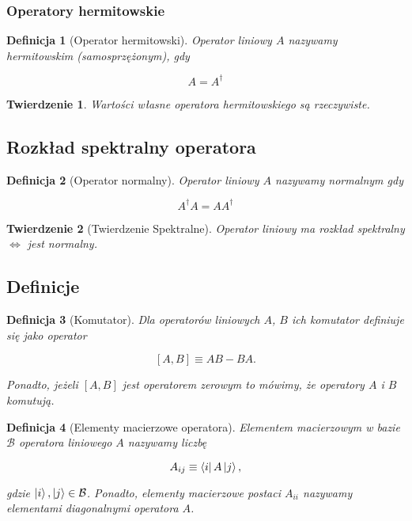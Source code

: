 \documentclass[a4paper,12pt]{article}
\newtheorem{definition}{Definicja}
\newtheorem{theorem}{Twierdzenie}
\begin{document}
\subsubsection{Operatory hermitowskie}

\begin{definition}[Operator hermitowski]
    Operator liniowy $A$ nazywamy hermitowskim (samosprzężonym), gdy

    $$
        A = A ^ {\dag}
    $$
\end{definition}

\begin{theorem}
    Wartości własne operatora hermitowskiego są rzeczywiste.
\end{theorem}

\subsection{Rozkład spektralny operatora}

\begin{definition}[Operator normalny]
    Operator liniowy $A$ nazywamy normalnym gdy

    $$
        A ^ {\dag} A = A A ^ {\dag}
    $$
\end{definition}

\begin{theorem}[Twierdzenie Spektralne]
    Operator liniowy ma rozkład spektralny $\Leftrightarrow$ jest normalny.
\end{theorem}

\subsection{Definicje}

\begin{definition}[Komutator]
    Dla operatorów liniowych $A$, $B$ ich komutator definiuje się jako operator

    $$
        [A, B] \equiv A B - B A.
    $$

    Ponadto, jeżeli $[A, B]$ jest operatorem zerowym to mówimy, że operatory $A$ i $B$ komutują.
\end{definition}

\begin{definition}[Elementy macierzowe operatora]
    Elementem macierzowym w bazie $\mathcal{B}$ operatora liniowego $A$ nazywamy liczbę

    $$
        A_{ij} \equiv \bra{i} A \ket{j},
    $$

    gdzie $\ket{i}, \ket{j} \in \mathcal{B}$. Ponadto, elementy macierzowe postaci $A_{ii}$ nazywamy elementami diagonalnymi operatora $A$.
\end{definition}
\end{document}
